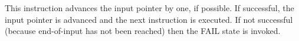 This instruction advances the input pointer by one, if possible.
If successful, the input pointer is advanced and the next instruction
is executed. If not successful
(because end-of-input has not been reached)
then the FAIL state is invoked.
